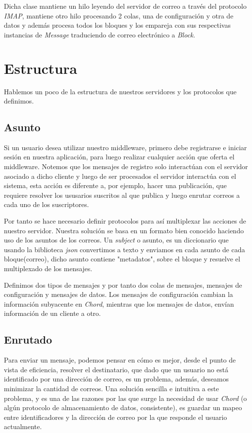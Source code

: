 \documentclass[a4paper]{article}
\begin{document}
	Dicha clase mantiene un hilo leyendo del servidor de correo a través del protocolo \emph{IMAP}, mantiene otro hilo procesando 2 colas, una de configuración y otra de datos y además procesa todos los bloques y los empareja con sus respectivas instancias de \emph{Message} traduciendo de correo electrónico a \emph{Block}.
	
\section{Estructura}
Hablemos un poco de la estructura de nuestros servidores y los protocolos que definimos.

	\subsection{Asunto}
	Si un usuario desea utilizar nuestro middleware, primero debe registrarse e iniciar sesión en nuestra aplicación, para luego realizar cualquier acción que oferta el middleware. Notemos que los mensajes de registro solo interactúan con el servidor asociado a dicho cliente y luego de ser procesados el servidor interactúa con el sistema, esta acción es diferente a, por ejemplo, hacer una publicación, que requiere resolver los ususarios suscritos al que publica y luego enrutar correos a cada uno de los suscriptores.
	 
	Por tanto se hace necesario definir protocolos para así multiplexar las acciones de nuestro servidor. Nuestra solución se basa en un formato bien conocido haciendo uso de los asuntos de los correos. Un \emph{subject} o asunto, es un diccionario que usando la biblioteca \emph{json} convertimos a texto y enviamos en cada asunto de cada bloque(correo), dicho asunto contiene "metadatos", sobre el bloque y resuelve el multiplexado de los mensajes.
	
	Definimos dos tipos de mensajes y por tanto dos colas de mensajes, mensajes de configuración y mensajes de datos. Los mensajes de configuración cambian la información subyacente en \emph{Chord}, mientras que los mensajes de datos, envían información de un cliente a otro.
	
	 
	\subsection{Enrutado}
	Para enviar un mensaje, podemos pensar en cómo es mejor, desde el punto de vista de eficiencia, resolver el destinatario, que dado que un usuario no está identificado por una dirección de correo, es un problema, además, deseamos minimizar la cantidad de correos. Una solución sencilla e intuitiva a este problema, y es una de las razones por las que surge la necesidad de usar \emph{Chord} (o algún protocolo de almacenamiento de datos, consistente), es guardar un mapeo entre identificadores y la dirección de correo por la que responde el usuario actualmente. 
	
\end{document}
